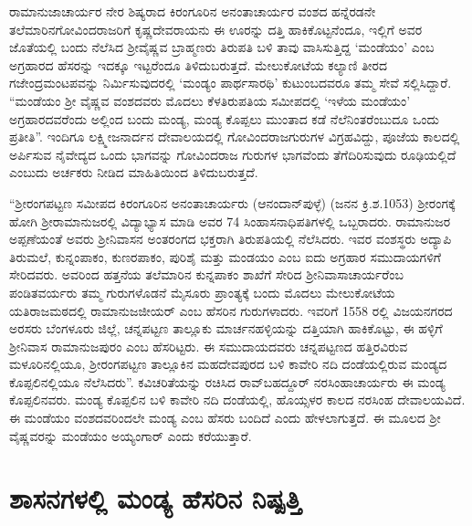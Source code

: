 ರಾಮಾನುಜಾಚಾರ್ಯರ ನೇರ ಶಿಷ್ಯರಾದ ಕಿರಂಗೂರಿನ ಅನಂತಾಚಾರ್ಯರ ವಂಶದ ಹನ್ನೆರಡನೇ ತಲೆಮಾರಿನ\break ಗೋವಿಂದರಾಜರಿಗೆ ಕೃಷ್ಣದೇವರಾಯನು ಈ ಊರನ್ನು ದತ್ತಿ ಹಾಕಿಕೊಟ್ಟನೆಂದೂ, ಇಲ್ಲಿಗೆ ಅವರ ಜೊತೆಯಲ್ಲಿ ಬಂದು ನೆಲೆಸಿದ ಶ‍್ರೀವೈಷ್ಣವ ಬ್ರಾಹ್ಮಣರು ತಿರುಪತಿ ಬಳಿ ತಾವು ವಾಸಿಸುತ್ತಿದ್ದ ‘ಮಂಡೆಯಂ’ ಎಂಬ ಅಗ್ರಹಾರದ ಹೆಸರನ್ನು ಇದಕ್ಕೂ ಇಟ್ಟರೆಂದೂ ತಿಳಿದುಬರುತ್ತದೆ. ಮೇಲುಕೋಟೆಯ ಕಲ್ಯಾಣಿ ತೀರದ ಗಜೇಂದ್ರಮಂಟಪವನ್ನು ನಿರ್ಮಿಸುವುದರಲ್ಲಿ ‘ಮಂಡ್ಯಂ ಪಾರ್ಥಸಾರಥಿ’ ಕುಟುಂಬದವರೂ ತಮ್ಮ ಸೇವೆ ಸಲ್ಲಿಸಿದ್ದಾರೆ. “ಮಂಡೆಯಂ ಶ‍್ರೀ ವೈಷ್ಣವ ವಂಶದವರು ಮೊದಲು ಕೆಳತಿರುಪತಿಯ ಸಮೀಪದಲ್ಲಿ ‘ಇಳೆಯ ಮಂಡೆಯಂ’ ಅಗ್ರಹಾರದವರೆಂದು ಅಲ್ಲಿಂದ ಬಂದು ಮಂಡ್ಯ, ಮಂಡ್ಯ ಕೊಪ್ಪಲು ಮುಂತಾದ ಕಡೆ ನೆಲೆನಿಂತರೆಂಬುದೂ ಒಂದು ಪ್ರತೀತಿ”. ಇಂದಿಗೂ ಲಕ್ಷ್ಮೀಜನಾರ್ದನ ದೇವಾಲಯದಲ್ಲಿ ಗೋವಿಂದರಾಜಗುರುಗಳ ವಿಗ್ರಹವಿದ್ದು, ಪೂಜೆಯ ಕಾಲದಲ್ಲಿ ಅರ್ಪಿಸುವ ನೈವೇದ್ಯದ ಒಂದು ಭಾಗವನ್ನು ಗೋವಿಂದರಾಜ ಗುರುಗಳ ಭಾಗವೆಂದು ತೆಗೆದಿರಿಸುವುದು ರೂಢಿಯಲ್ಲಿದೆ ಎಂಬುದು ಅರ್ಚಕರು ನೀಡಿದ ಮಾಹಿತಿಯಿಂದ ತಿಳಿದುಬರುತ್ತದೆ.

“ಶ‍್ರೀರಂಗಪಟ್ಟಣ ಸಮೀಪದ ಕಿರಂಗೂರಿನ ಅನಂತಾಚಾರ್ಯರು (ಆನಂದಾನ್​ಪುಳ್ಳೆ) (ಜನನ ಕ್ರಿ.ಶ.1053) ಶ‍್ರೀರಂಗಕ್ಕೆ ಹೋಗಿ ಶ‍್ರೀರಾಮಾನುಜರಲ್ಲಿ ವಿದ್ಯಾಭ್ಯಾಸ ಮಾಡಿ ಅವರ 74 ಸಿಂಹಾಸನಾಧಿಪತಿಗಳಲ್ಲಿ ಒಬ್ಬರಾದರು. ರಾಮಾನುಜರ ಅಪ್ಪಣೆಯಂತೆ ಅವರು ಶ‍್ರೀನಿವಾಸನ ಅಂತರಂಗದ ಭಕ್ತರಾಗಿ ತಿರುಪತಿಯಲ್ಲಿ ನೆಲೆಸಿದರು. ಇವರ ವಂಶಸ್ಥರು ಅದ್ಯಾಪಿ ತಿರುಮಲೆ, ಕುನ್ನಂಪಾಕಂ, ಕುಣರಪಾಕಂ, ಪುರಿಶೈ ಮತ್ತು ಮಂಡಯಂ ಎಂಬ ಐದು ಅಗ್ರಹಾರ ಸಮುದಾಯಗಳಿಗೆ ಸೇರಿದವರು. ಅವರಿಂದ ಹತ್ತನೆಯ ತಲೆಮಾರಿನ ಕುನ್ನಪಾಕಂ ಶಾಖೆಗೆ ಸೇರಿದ ಶ‍್ರೀನಿವಾಸಾಚಾರ್ಯರೆಂಬ ಪಂಡಿತವರ್ಯರು ತಮ್ಮ ಗುರುಗಳೊಡನೆ ಮೈಸೂರು ಪ್ರಾಂತ್ಯಕ್ಕೆ ಬಂದು ಮೊದಲು ಮೇಲುಕೋಟೆಯ ಯತಿರಾಜಮಠದಲ್ಲಿ ರಾಮಾನುಜಜೀಯರ್​ ಎಂಬ ಹೆಸರಿನ ಗುರುಗಳಾದರು. ಇವರಿಗೆ 1558 ರಲ್ಲಿ ವಿಜಯನಗರದ ಅರಸರು ಬೆಂಗಳೂರು ಜಿಲ್ಲೆ, ಚನ್ನಪಟ್ಟಣ ತಾಲ್ಲೂಕು ಮಾರ್ಚನಹಳ್ಳಿಯನ್ನು ದತ್ತಿಯಾಗಿ ಹಾಕಿಕೊಟ್ಟು, ಈ ಹಳ್ಳಿಗೆ ಶ‍್ರೀನಿವಾಸ ರಾಮಾನುಜಪುರಂ ಎಂಬ ಹೆಸರಿಟ್ಟರು. ಈ ಸಮುದಾಯದವರು ಚನ್ನಪಟ್ಟಣದ ಹತ್ತಿರವಿರುವ ಮಳೂರಿನಲ್ಲಿಯೂ, ಶ‍್ರೀರಂಗಪಟ್ಟಣ ತಾಲ್ಲೂಕಿನ ಮಹದೇವಪುರದ ಬಳಿ ಕಾವೇರಿ ನದಿ ದಂಡೆಯಲ್ಲಿರುವ ಮಂಡ್ಯದ ಕೊಪ್ಪಲಿನಲ್ಲಿಯೂ ನೆಲೆಸಿದರು”. ಕವಿಚರಿತೆಯನ್ನು ರಚಿಸಿದ ರಾವ್​ಬಹದ್ದೂರ್​ ನರಸಿಂಹಾಚಾರ್ಯರು ಈ ಮಂಡ್ಯ ಕೊಪ್ಪಲಿನವರು. ಮಂಡ್ಯ ಕೊಪ್ಪಲಿನ ಬಳಿ ಕಾವೇರಿ ನದಿ ದಂಡೆಯಲ್ಲಿ, ಹೊಯ್ಸಳರ ಕಾಲದ ನರಸಿಂಹ ದೇವಾಲಯವಿದೆ. ಈ ಮಂಡೆಯಂ ವಂಶದವರಿಂದಲೇ ಮಂಡ್ಯ ಎಂಬ ಹೆಸರು ಬಂದಿದೆ ಎಂದು ಹೇಳಲಾಗುತ್ತದೆ. ಈ ಮೂಲದ ಶ‍್ರೀ ವೈಷ್ಣವರನ್ನು ಮಂಡೆಯಂ ಅಯ್ಯಂಗಾರ್​ ಎಂದು ಕರೆಯುತ್ತಾರೆ.


\section{ಶಾಸನಗಳಲ್ಲಿ ಮಂಡ್ಯ ಹೆಸರಿನ ನಿಷ್ಪತ್ತಿ}

